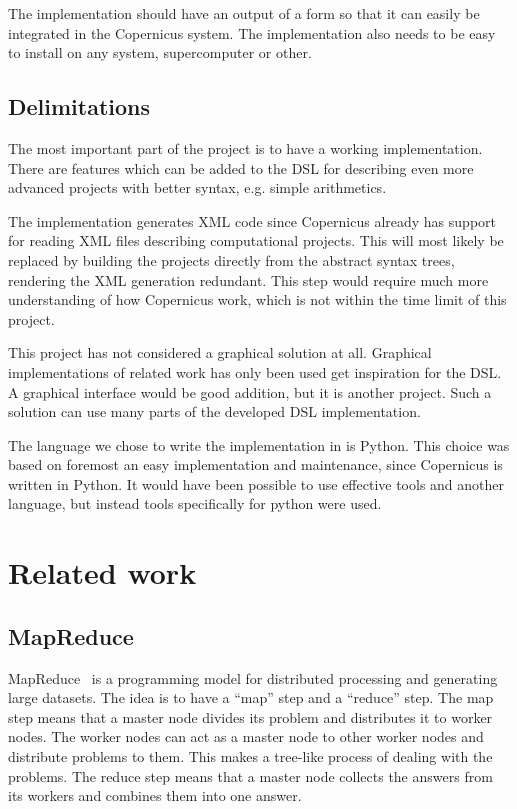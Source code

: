 The implementation should have an output of a form so that it can
easily be integrated in the Copernicus system. The implementation
also needs to be easy to install on any system, supercomputer or
other.

\subsection{Delimitations}
The most important part of the project is to have a working
implementation. There are features which can be added to the DSL for
describing even more advanced projects with better syntax, e.g. simple
arithmetics.

The implementation generates XML code since Copernicus already has
support for reading XML files describing computational projects. This
will most likely be replaced by building the projects directly from
the abstract syntax trees, rendering the XML generation
redundant. This step would require much more understanding of how
Copernicus work, which is not within the time limit of this project.

This project has not considered a graphical solution at all. Graphical
implementations of related work has only been used get inspiration for
the DSL. A graphical interface would be good addition, but it is
another project. Such a solution can use many parts of the developed
DSL implementation.

The language we chose to write the implementation in is Python. This
choice was based on foremost an easy implementation and maintenance,
since Copernicus is written in Python. It would have been possible to
use effective tools and another language, but instead tools
specifically for python were used.


\section{Related work}

\subsection{MapReduce}
MapReduce~\cite{dean:2008} is a programming model for distributed
processing and generating large datasets. The idea is to have a
``map'' step and a ``reduce'' step. The map step means that a master
node divides its problem and distributes it to worker nodes. The
worker nodes can act as a master node to other worker nodes and
distribute problems to them. This makes a tree-like process of dealing
with the problems. The reduce step means that a master node collects
the answers from its workers and combines them into one answer.

